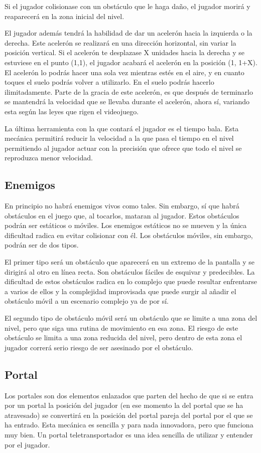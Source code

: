 Si el jugador colisionase con un obstáculo que le haga daño, el jugador morirá y reaparecerá en la zona inicial del nivel.

El jugador además tendrá la habilidad de dar un acelerón hacia la izquierda o la derecha. Este acelerón se realizará en una dirección horizontal, sin variar la posición vertical. Si el acelerón te desplazase X unidades hacia la derecha y se estuviese en el punto (1,1), el jugador acabará el acelerón en la posición (1, 1+X). El acelerón lo podrás hacer una sola vez mientras estés en el aire, y en cuanto toques el suelo podrás volver a utilizarlo. En el suelo podrás hacerlo ilimitadamente. Parte de la gracia de este acelerón, es que después de terminarlo se mantendrá la velocidad que se llevaba durante el acelerón, ahora sí, variando esta según las leyes que rigen el videojuego.

La última herramienta con la que contará el jugador es el tiempo bala. Esta mecánica permitirá reducir la velocidad a la que pasa el tiempo en el nivel permitiendo al jugador actuar con la precisión que ofrece que todo el nivel se reproduzca menor velocidad.

\subsection{Enemigos}
En principio no habrá enemigos vivos como tales. Sin embargo, sí que habrá obstáculos en el juego que, al tocarlos, mataran al jugador. Estos obstáculos podrán ser estáticos o móviles. Los enemigos estáticos no se mueven y la única dificultad radica en evitar colisionar con él. Los obstáculos móviles, sin embargo, podrán ser de dos tipos.

El primer tipo será un obstáculo que aparecerá en un extremo de la pantalla y se dirigirá al otro en línea recta. Son obstáculos fáciles de esquivar y predecibles. La dificultad de estos obstáculos radica en lo complejo que puede resultar enfrentarse a varios de ellos y la complejidad improvisada que puede surgir al añadir el obstáculo móvil a un escenario complejo ya de por sí.

El segundo tipo de obstáculo móvil será un obstáculo que se limite a una zona del nivel, pero que siga una rutina de movimiento en esa zona. El riesgo de este obstáculo se limita a una zona reducida del nivel, pero dentro de esta zona el jugador correrá serio riesgo de ser asesinado por el obstáculo.

\subsection{Portal}
Los portales son dos elementos enlazados que parten del hecho de que si se entra por un portal la posición del jugador (en ese momento la del portal que se ha atravesado) se convertirá en la posición del portal pareja del portal por el que se ha entrado. Esta mecánica es sencilla y para nada innovadora, pero que funciona muy bien. Un portal teletransportador es una idea sencilla de utilizar y entender por el jugador.

